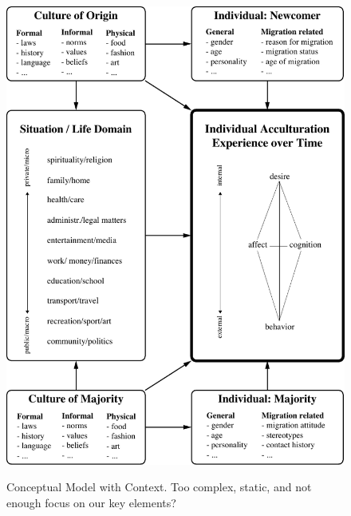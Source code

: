 \documentclass[man, 12pt, a4paper]{apa7}
\begin{document}
\begin{figure}[h]
\centering
\caption{Conceptual Model with Context. Too complex, static, and not enough focus on our key elements?}
\includegraphics[width=\textwidth]{Figures/ConceptualFrameworkStatic.pdf}
\label{fig:SupModelContext}
\end{figure}
\end{document}
